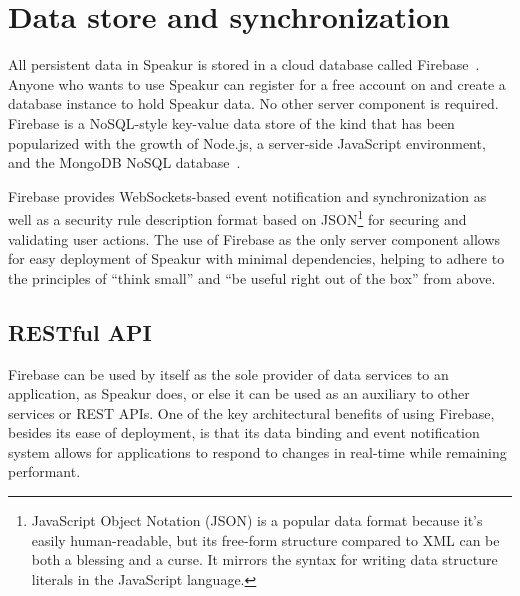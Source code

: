 \section{Data store and synchronization}
All persistent data in Speakur is stored in a cloud database called Firebase~\cite{firebasecontributors2015}.
Anyone who wants to use Speakur can register for a free account on  and create a database instance to hold Speakur data.
No other server component is required.
Firebase is a NoSQL-style key-value data store of the kind that has been popularized
with the growth of 
Node.js, a server-side JavaScript environment,
and the MongoDB NoSQL database~\cite{dickey2014}.

Firebase provides WebSockets-based event notification and synchronization 
as well as a security rule description format based on 
JSON\footnote{JavaScript Object Notation (JSON) is a popular data format because it's easily human-readable, 
but its free-form structure compared to XML can be both a blessing and a curse.  
It mirrors the syntax for writing data structure literals in the JavaScript language.} 
for securing and validating user actions.
The use of Firebase as the only server component allows for easy deployment of Speakur with minimal dependencies, helping to adhere to the principles of ``think small'' and ``be useful right out of the box'' from above.

\subsection{RESTful API}
Firebase can be used by itself as the sole provider of data services to an application, as Speakur does, or else it can be used as an auxiliary to other services or REST APIs.
One of the key architectural benefits of using Firebase, 
besides its ease of deployment, 
is that its data binding and event notification system allows for 
applications to respond to changes in real-time while remaining performant.


